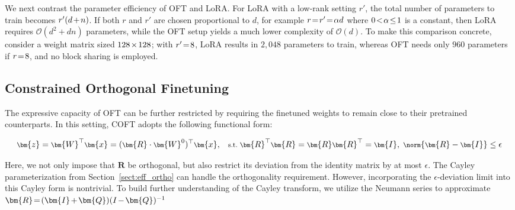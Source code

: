 We next contrast the parameter efficiency of OFT and LoRA. For LoRA with a low-rank setting $r'$, the total number of parameters to train becomes $\thickmuskip=2mu \medmuskip=2mu r'(d+n)$. If both $r$ and $r'$ are chosen proportional to $d$, for example $\thickmuskip=2mu \medmuskip=2mu r=r'=\alpha d$ where $\thickmuskip=2mu \medmuskip=2mu 0<\alpha\leq 1$ is a constant, then LoRA requires $\mathcal{O}(d^2+dn)$ parameters, while the OFT setup yields a much lower complexity of $\mathcal{O}(d)$. To make this comparison concrete, consider a weight matrix sized $\thickmuskip=2mu \medmuskip=2mu 128\times 128$; with $\thickmuskip=2mu \medmuskip=2mu r'=8$, LoRA results in $2,048$ parameters to train, whereas OFT needs only $960$ parameters if $\thickmuskip=2mu \medmuskip=2mu r=8$, and no block sharing is employed.

\subsection{Constrained Orthogonal Finetuning}

The expressive capacity of OFT can be further restricted by requiring the finetuned weights to remain close to their pretrained counterparts. In this setting, COFT adopts the following functional form:

\begin{equation}\label{eq:coft_general}
    \footnotesize
    \bm{z}=\bm{W}^\top\bm{x}=(\bm{R}\cdot\bm{W}^0)^\top\bm{x},~~~\text{s.t.}~\bm{R}^\top\bm{R}=\bm{R}\bm{R}^\top=\bm{I},~\norm{\bm{R}-\bm{I}}\leq \epsilon
\end{equation}

Here, we not only impose that $\bm{R}$ be orthogonal, but also restrict its deviation from the identity matrix by at most $\epsilon$. The Cayley parameterization from Section~\ref{sect:eff_ortho} can handle the orthogonality requirement. However, incorporating the $\epsilon$-deviation limit into this Cayley form is nontrivial. To build further understanding of the Cayley transform, we utilize the Neumann series to approximate $\thickmuskip=2mu \medmuskip=2mu \bm{R}=(\bm{I}+\bm{Q})(I-\bm{Q})^{-1}$

